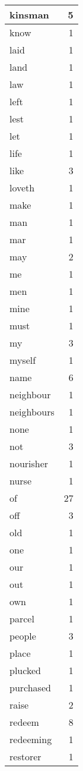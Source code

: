\begin{center}
\begin{longtable}{l|r}
kinsman & 5 \\ \hline
know & 1 \\ \hline
laid & 1 \\ \hline
land & 1 \\ \hline
law & 1 \\ \hline
left & 1 \\ \hline
lest & 1 \\ \hline
let & 1 \\ \hline
life & 1 \\ \hline
like & 3 \\ \hline
loveth & 1 \\ \hline
make & 1 \\ \hline
man & 1 \\ \hline
mar & 1 \\ \hline
may & 2 \\ \hline
me & 1 \\ \hline
men & 1 \\ \hline
mine & 1 \\ \hline
must & 1 \\ \hline
my & 3 \\ \hline
myself & 1 \\ \hline
name & 6 \\ \hline
neighbour & 1 \\ \hline
neighbours & 1 \\ \hline
none & 1 \\ \hline
not & 3 \\ \hline
nourisher & 1 \\ \hline
nurse & 1 \\ \hline
of & 27 \\ \hline
off & 3 \\ \hline
old & 1 \\ \hline
one & 1 \\ \hline
our & 1 \\ \hline
out & 1 \\ \hline
own & 1 \\ \hline
parcel & 1 \\ \hline
people & 3 \\ \hline
place & 1 \\ \hline
plucked & 1 \\ \hline
purchased & 1 \\ \hline
raise & 2 \\ \hline
redeem & 8 \\ \hline
redeeming & 1 \\ \hline
restorer & 1 \\ \hline

\end{longtable}
\end{center}

